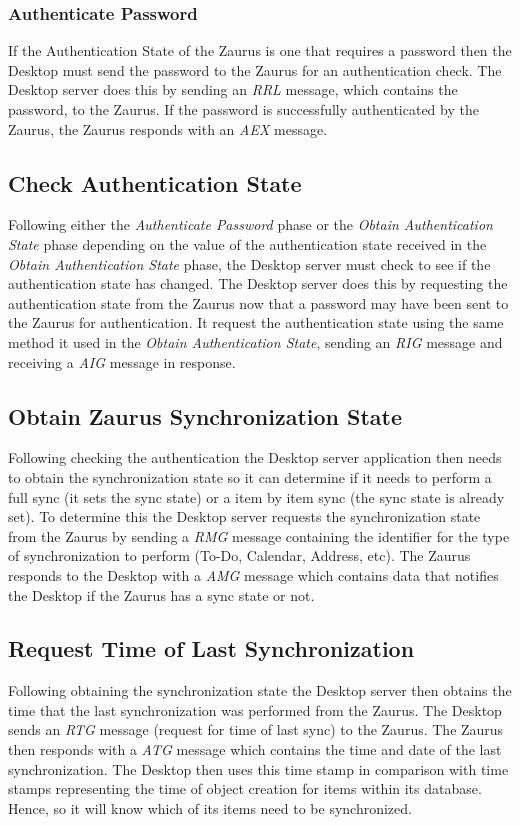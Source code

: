     \subsubsection{Authenticate Password}
    If the Authentication State of the Zaurus is one that requires a password
    then the Desktop must send the password to the Zaurus for an
    authentication check. The Desktop server does this by sending an \emph{RRL}
    message, which contains the password, to the Zaurus. If the password is
    successfully authenticated by the Zaurus, the Zaurus responds with an
    \emph{AEX} message.

    \subsection{Check Authentication State}
    Following either the \emph{Authenticate Password} phase or the
    \emph{Obtain Authentication State} phase depending on the value of the
    authentication state received in the \emph{Obtain Authentication State}
    phase, the Desktop server must check to see if the authentication state
    has changed. The Desktop server does this by requesting the authentication
    state from the Zaurus now that a password may have been sent to the Zaurus
    for authentication. It request the authentication state using the same
    method it used in the \emph{Obtain Authentication State}, sending an
    \emph{RIG} message and receiving a \emph{AIG} message in response.

    \subsection{Obtain Zaurus Synchronization State}
    Following checking the authentication the Desktop server application then
    needs to obtain the synchronization state so it can determine if it needs
    to perform a full sync (it sets the sync state) or a item by item sync
    (the sync state is already set). To determine this the Desktop server
    requests the synchronization state from the Zaurus by sending a \emph{RMG}
    message containing the identifier for the type of synchronization to
    perform (To-Do, Calendar, Address, etc). The Zaurus responds to the Desktop
    with a \emph{AMG} message which contains data that notifies the Desktop if
    the Zaurus has a sync state or not.

    \subsection{Request Time of Last Synchronization}
    Following obtaining the synchronization state the Desktop server then
    obtains the time that the last synchronization was performed from the
    Zaurus. The Desktop sends an \emph{RTG} message (request for time of last
    sync)  to the Zaurus. The Zaurus then responds with a \emph{ATG} message
    which contains the time and date of the last synchronization. The Desktop
    then uses this time stamp in comparison with time stamps representing the
    time of object creation for items within its database. Hence, so it will
    know which of its items need to be synchronized.

